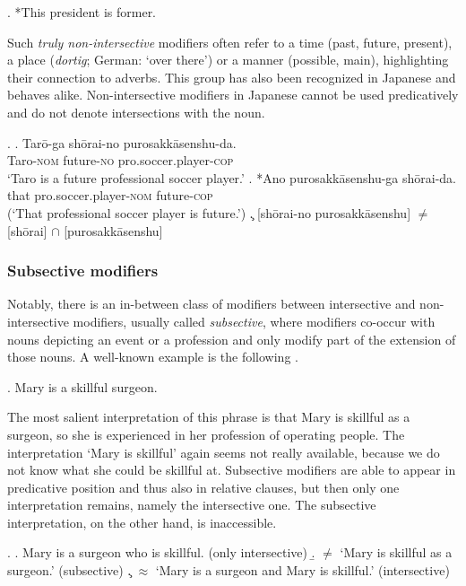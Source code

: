 \ex. *This president is former.

Such \textit{truly non-intersective} modifiers often refer to a time (past, future, present), a place (\textit{dortig};  German: `over there’) or a manner (possible, main), highlighting their connection to adverbs. This group has also been recognized in Japanese \citep{yamakido:2005:nature, ayano:2010:revisiting} and behaves alike. Non-intersective modifiers in Japanese cannot be used predicatively and do not denote intersections with the noun.

\ex. \ag. Tarō-ga shōrai-no purosakkāsenshu-da.\\
Taro-\textsc{nom} future-\textsc{no} pro.soccer.player-\textsc{cop}\\
`Taro is a future professional soccer player.’
\bg. *Ano purosakkāsenshu-ga shōrai-da.\\
that pro.soccer.player-\textsc{nom} future-\textsc{cop}\\
(`That professional soccer player is future.’)
\c. [shōrai-no purosakkāsenshu] $\neq$ [shōrai] $\cap$ [purosakkāsenshu]

\subsubsection{Subsective modifiers}

Notably, there is an in-between class of modifiers between intersective and non-intersective modifiers, usually called \textit{subsective}, where modifiers co-occur with nouns depicting an event or a profession and only modify part of the extension of those nouns. A well-known example is the following \citep[137–138]{kamp:1995:prototype}.

\ex. Mary is a skillful surgeon.

The most salient interpretation of this phrase is that Mary is skillful as a surgeon, so she is experienced in her profession of operating people. The interpretation `Mary is skillful’ again seems not really available, because we do not know what she could be skillful at. Subsective modifiers are able to appear in predicative position and thus also in relative clauses, but then only one interpretation remains, namely the intersective one. The subsective interpretation, on the other hand, is inaccessible.

\ex. \a. Mary is a surgeon who is skillful. (only intersective)
\b. $\neq$ `Mary is skillful as a surgeon.’ (subsective)
\c. $\approx$ `Mary is a surgeon and Mary is skillful.’ (intersective)

